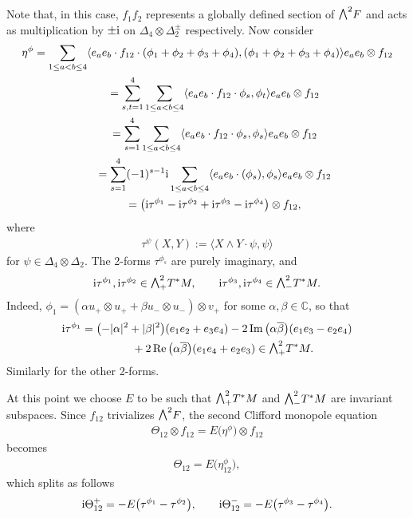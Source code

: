 \documentclass[10pt,a4paper]{amsart}
\newcommand{\ext}{\raise1pt\hbox{\small$\bigwedge$}}
\numberwithin{equation}{section}
\begin{document}
{\allowdisplaybreaks
Note that, in this case, $f_1f_2$ represents a globally defined section of $\ext^2 F$ and acts as multiplication by $\pm {\rm i}$ on $\Delta_4\otimes\Delta_2^\pm$ respectively. Now consider
\begin{gather*}
\eta^\phi = \sum_{1\leq a<b\leq 4}\langle e_ae_b\cdot f_{12}\cdot (\phi_1+\phi_2+\phi_3+\phi_4),
 (\phi_1+\phi_2+\phi_3+\phi_4)\rangle e_ae_b\otimes f_{12}\\
\hphantom{\eta^\phi}{}= \sum_{s,t=1}^4 \sum_{1\leq a<b\leq 4}\langle e_ae_b\cdot f_{12}\cdot \phi_s,\phi_t\rangle e_ae_b\otimes f_{12}\\
\hphantom{\eta^\phi}{} = \sum_{s=1}^4 \sum_{1\leq a<b\leq 4}\langle e_ae_b\cdot f_{12}\cdot \phi_s,\phi_s\rangle e_ae_b\otimes f_{12}\\
\hphantom{\eta^\phi}{}= \sum_{s=1}^4(-1)^{s-1}{\rm i}\sum_{1\leq a<b\leq 4}\langle e_ae_b\cdot (\phi_s),\phi_s\rangle e_ae_b\otimes f_{12}\\
\hphantom{\eta^\phi}{} = \big({\rm i}\tau^{\phi_1} - {\rm i}\tau^{\phi_2} + {\rm i}\tau^{\phi_3} - {\rm i}\tau^{\phi_4}\big) \otimes f_{12} ,
\end{gather*}
where
\begin{gather*}\tau^{\psi}(X,Y):=\langle X\wedge Y\cdot\psi,\psi\rangle \end{gather*}
for $\psi\in\Delta_4\otimes\Delta_2$. The 2-forms $\tau^{\phi_s}$ are purely imaginary, and
\begin{gather*}{\rm i}\tau^{\phi_1},{\rm i}\tau^{\phi_2}\in \ext^2_+T^*M,\qquad {\rm i}\tau^{\phi_3},{\rm i}\tau^{\phi_4}\in \ext^2_-T^*M.\end{gather*}
Indeed, $\phi_1=(\alpha u_+\otimes u_+ + \beta u_-\otimes u_- )\otimes v_+ $ for some $\alpha,\beta\in\mathbb{C}$, so that
\begin{gather*}{\rm i}\tau^{\phi_1}=
\big({-}|\alpha|^2+|\beta|^2\big)(e_1e_2+e_3e_4) -2\operatorname{Im}\big(\alpha\overline{\beta}\big)(e_1e_3-e_2e_4)\\
\hphantom{{\rm i}\tau^{\phi_1}=}{}
+2\operatorname{Re}\big(\alpha\overline{\beta}\big)(e_1e_4+e_2e_3)\in\ext^2_+T^*M.
\end{gather*}
Similarly for the other 2-forms.

}

At this point we choose $E$ to be such that $\ext^2_+T^*M$ and $\ext^2_-T^*M$ are invariant subspaces. Since $f_{12}$ trivializes $\ext^2 F$, the second Clifford monopole equation
\begin{gather*}\Theta_{12}\otimes f_{12} = E\big(\eta^{\phi}\big)\otimes f_{12}\end{gather*}
becomes
\begin{gather*}\Theta_{12} = E\big(\eta_{12}^\phi\big),\end{gather*}
which splits as follows
\begin{gather*}
{\rm i}\Theta_{12}^+ = -E\big(\tau^{\phi_1}-\tau^{\phi_2}\big),\qquad
{\rm i}\Theta_{12}^- = -E\big(\tau^{\phi_3}-\tau^{\phi_4}\big).
\end{gather*}
\end{document}
